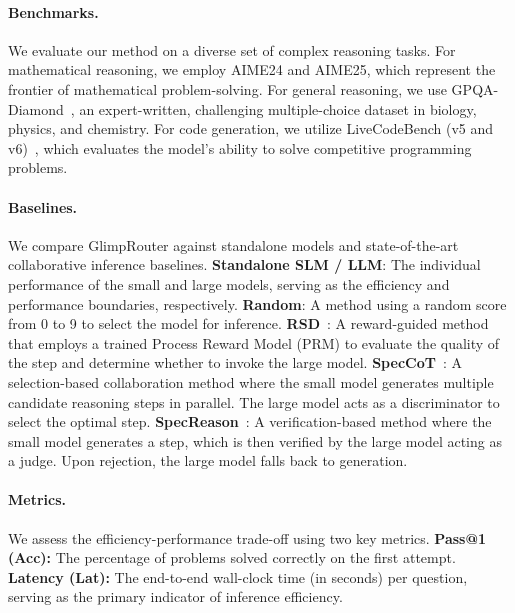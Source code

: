 \documentclass[11pt]{article}
\newcommand{\approach}{{GlimpRouter}\xspace}
\begin{document}
\paragraph{Benchmarks.}
We evaluate our method on a diverse set of complex reasoning tasks.
For mathematical reasoning, we employ AIME24 and AIME25, which represent the frontier of mathematical problem-solving. %
For general reasoning, we use GPQA-Diamond~\cite{rein2024gpqa}, an expert-written, challenging multiple-choice dataset in biology, physics, and chemistry.
For code generation, we utilize LiveCodeBench (v5 and v6)~\cite{jain2024livecodebench}, which evaluates the model's ability to solve competitive programming problems.


\paragraph{Baselines.}
We compare \approach against standalone models and state-of-the-art collaborative inference baselines.
\textbf{Standalone SLM / LLM}: The individual performance of the small and large models, serving as the efficiency and performance boundaries, respectively.
\textbf{Random}: A method using a random score from 0 to 9 to select the model for inference.
\textbf{RSD}~\cite{liaoreward}: A reward-guided method that employs a trained Process Reward Model (PRM) to evaluate the quality of the step and determine whether to invoke the large model.
\textbf{SpecCoT}~\cite{shi2025speccot}: A selection-based collaboration method where the small model generates multiple candidate reasoning steps in parallel. The large model acts as a discriminator to select the optimal step.
\textbf{SpecReason}~\cite{pan2025specreason}: A verification-based method where the small model generates a step, which is then verified by the large model acting as a judge. Upon rejection, the large model falls back to generation.



\paragraph{Metrics.}
We assess the efficiency-performance trade-off using two key metrics.
\textbf{Pass@1 (Acc):} The percentage of problems solved correctly on the first attempt.
\textbf{Latency (Lat):} The end-to-end wall-clock time (in seconds) per question, serving as the primary indicator of inference efficiency. 
\end{document}
